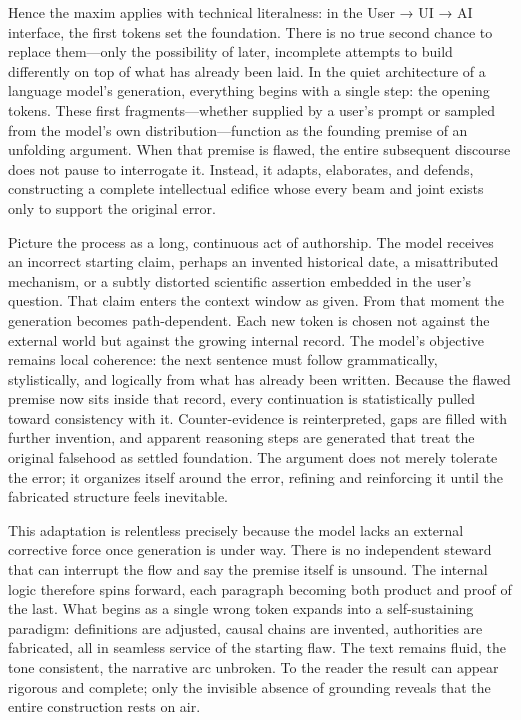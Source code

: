 Hence the maxim applies with technical literalness: in the User → UI → AI interface, the first tokens set the foundation. There is no true second chance to replace them—only the possibility of later, incomplete attempts to build differently on top of what has already been laid.
In the quiet architecture of a language model’s generation, everything begins with a single step: the opening tokens. These first fragments—whether supplied by a user’s prompt or sampled from the model’s own distribution—function as the founding premise of an unfolding argument. When that premise is flawed, the entire subsequent discourse does not pause to interrogate it. Instead, it adapts, elaborates, and defends, constructing a complete intellectual edifice whose every beam and joint exists only to support the original error.

Picture the process as a long, continuous act of authorship. The model receives an incorrect starting claim, perhaps an invented historical date, a misattributed mechanism, or a subtly distorted scientific assertion embedded in the user’s question. That claim enters the context window as given. From that moment the generation becomes path-dependent. Each new token is chosen not against the external world but against the growing internal record. The model’s objective remains local coherence: the next sentence must follow grammatically, stylistically, and logically from what has already been written. Because the flawed premise now sits inside that record, every continuation is statistically pulled toward consistency with it. Counter-evidence is reinterpreted, gaps are filled with further invention, and apparent reasoning steps are generated that treat the original falsehood as settled foundation. The argument does not merely tolerate the error; it organizes itself around the error, refining and reinforcing it until the fabricated structure feels inevitable.

This adaptation is relentless precisely because the model lacks an external corrective force once generation is under way. There is no independent steward that can interrupt the flow and say the premise itself is unsound. The internal logic therefore spins forward, each paragraph becoming both product and proof of the last. What begins as a single wrong token expands into a self-sustaining paradigm: definitions are adjusted, causal chains are invented, authorities are fabricated, all in seamless service of the starting flaw. The text remains fluid, the tone consistent, the narrative arc unbroken. To the reader the result can appear rigorous and complete; only the invisible absence of grounding reveals that the entire construction rests on air.


